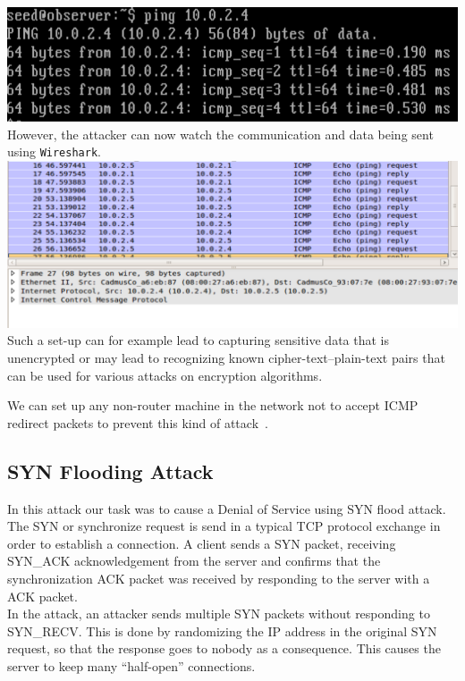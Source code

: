 \documentclass[12pt, a4paper]{article}
\begin{document}
\includegraphics[width=.95\textwidth]{gfx/imcp-ping}\\

However, the attacker can now watch the communication and data being sent using \texttt{Wireshark}.\\

\includegraphics[width=.95\textwidth]{gfx/imcp-shark}\\

Such a set-up can for example lead to capturing sensitive data that is unencrypted or may lead to recognizing known cipher-text--plain-text pairs that can be used for various attacks on encryption algorithms.

We can set up any non-router machine in the network not to accept ICMP redirect packets to prevent this kind of attack~\cite{imcp}.

\subsection{SYN Flooding Attack}

In this attack our task was to cause a Denial of Service using SYN flood attack. The SYN or synchronize request is send in a typical TCP protocol exchange in order to establish a connection. A client sends a SYN packet, receiving SYN\_ACK acknowledgement from the server and confirms that the synchronization ACK packet was received by responding to the server with a ACK packet.\\

In the attack, an attacker sends multiple SYN packets without responding to SYN\_RECV. This is done by randomizing the IP address in the original SYN request, so that the response goes to nobody as a consequence. This causes the server to keep many ``half-open'' connections.\\
\end{document}

